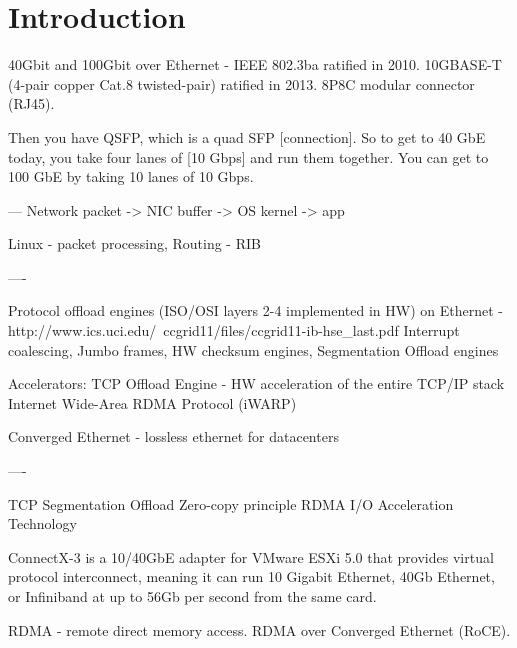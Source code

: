 
\chapter{Introduction}

40Gbit and 100Gbit over Ethernet - IEEE 802.3ba ratified in 2010.
10GBASE-T (4-pair copper Cat.8 twisted-pair) ratified in 2013.
8P8C modular connector (RJ45).

Then you have QSFP, which is a quad SFP [connection]. So to get to 40 GbE today, you take four lanes of [10 Gbps] and run them together. You can get to 100 GbE by taking 10 lanes of 10 Gbps.

---
Network packet -> NIC buffer -> OS kernel -> app

Linux - packet processing,
Routing - RIB

----

Protocol offload engines (ISO/OSI layers 2-4 implemented in HW)
on Ethernet - http://www.ics.uci.edu/~ccgrid11/files/ccgrid11-ib-hse_last.pdf
Interrupt coalescing, Jumbo frames, HW checksum engines, Segmentation Offload engines

Accelerators:
TCP Offload Engine - HW acceleration of the entire TCP/IP stack
Internet Wide-Area RDMA Protocol (iWARP)

Converged Ethernet - lossless ethernet for datacenters


----

TCP Segmentation Offload
Zero-copy principle
RDMA
I/O Acceleration Technology



ConnectX-3 is a 10/40GbE adapter for VMware ESXi 5.0 that provides virtual protocol interconnect, meaning it can run 10 Gigabit Ethernet, 40Gb Ethernet, or Infiniband at up to 56Gb per second from the same card.

RDMA - remote direct memory access.
RDMA over Converged Ethernet (RoCE).
